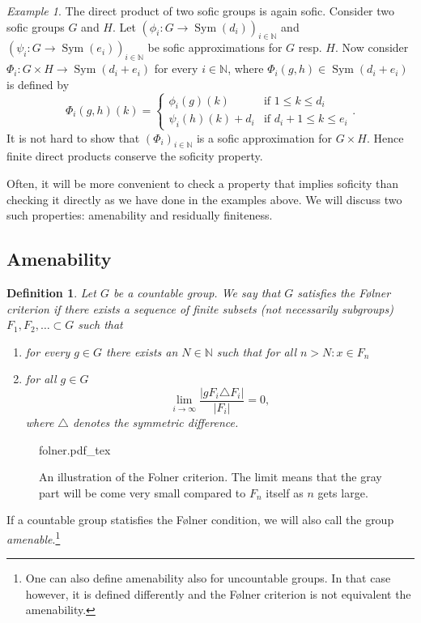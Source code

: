 \documentclass[titlepage, a4paper]{article}
\newcommand{\N}{\mathbb{N}}
\newcommand{\card}[1]{\left| #1 \right|}
\DeclareMathOperator{\sym}{Sym}
\newtheorem{definition}{Definition}
\theoremstyle{remark}
\newtheorem{example}{Example}
\newcommand{\incfig}[1]{%
    \def\svgwidth{.5\columnwidth}
    {#1.pdf_tex}
}
\begin{document}

    \begin{example}\label{ex:direct_product_sofic}
        The direct product of two sofic groups is again sofic. Consider two sofic groups $G$ and $H$. Let $(\phi_i: G \to \sym(d_i))_{i \in \N}$ and $(\psi_i: G \to \sym(e_i))_{i \in \N}$ be sofic approximations for $G$ resp. $H$. Now consider $\Phi_i : G \times H \to \sym(d_i+e_i)$ for every $i \in \N$, where $\Phi_i(g, h) \in \sym(d_i+e_i)$ is defined by
        \[
            \Phi_i(g,h)(k) = \begin{cases} \phi_i(g)(k) & \text{if } 1 \leq k \leq d_i \\
            \psi_i(h)(k)+d_i & \text{if } d_i + 1 \leq k \leq e_i
            \end{cases}.
        \]
        It is not hard to show that $(\Phi_i)_{i \in \N}$ is a sofic approximation for $G \times H$. %
        Hence finite direct products conserve the soficity property.
    \end{example}


    Often, it will be more convenient to check a property that implies soficity than checking it directly as we have done in the examples above. We will discuss two such properties: amenability and residually finiteness.

    \subsection{Amenability}



    \begin{definition}\cite{noauthor_folner_2019} \label{def:folner}
        Let $G$ be a countable group. We say that $G$ satisfies the Følner criterion if there exists a sequence of finite subsets (not necessarily subgroups) $F_1, F_2, \dots \subset G$ such that 
        \begin{enumerate}
            \item for every $g \in G$ there exists an $N \in \N$ such that for all $n > N: x \in F_n$
            \item for all $g \in G$ 
            \[\lim_{i\to \infty} \frac{\card{gF_i \triangle F_i}}{\card{F_i}} = 0, \]
            where $\triangle$ denotes the symmetric difference.
        \end{enumerate}
    \end{definition}
\begin{figure}[ht]
    \centering
    \incfig{folner}
    \caption{An illustration of the Folner criterion. The limit means that the gray part will be come very small compared to  $F_n$ itself as $n$ gets large.}
    \label{fig:riemmans-theorem}
\end{figure}
If a countable group statisfies the Følner condition, we will also call the group \emph{amenable}.\footnote{One can also define amenability also for uncountable groups. In that case however, it is defined differently and the Følner criterion is not equivalent the amenability.}
\end{document}

